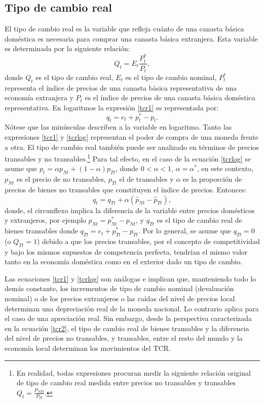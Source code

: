 \documentclass[12pt,letterpaper]{article}
\begin{document}
\subsection*{Tipo de cambio real}
El tipo de cambio real es la variable que refleja cuánto de una canasta básica doméstica es necesaria para comprar una canasta básica extranjera. Esta variable es determinada por la siguiente relación:
\begin{equation}\label{tcr1}
Q_t=E_t\frac{P_t^*}{P_t},
\end{equation}
donde $Q_t$ es el tipo de cambio real, $E_t$ es el tipo de cambio nominal, $P_t^*$ representa el índice de precios de una canasta básica representativa de una economía extranjera y $P_t$ es el índice de precios de una canasta básica doméstica representativa. En logaritmos la expresión \ref{tcr1} es representada por:
\begin{equation}\label{tcrlog}
q_t=e_t+p_t^*-p_t.
\end{equation}
Nótese que las minúsculas describen a la variable en logaritmo. Tanto las expresiones \ref{tcr1} y \ref{tcrlog} representan el poder de compra de una moneda frente a otra. El tipo de cambio real también puede ser analizado en términos de precios transables y no transables.\footnote{En realidad, todas expresiones procuran medir la siguiente relación original de tipo de cambio real medida entre precios no transables y transables $Q_t=\frac{P_{NTt}}{P_{Tt}}$.} Para tal efecto, en el caso de la ecuación \ref{tcrlog} se asume que $p_t=\alpha p_{Nt} + (1-\alpha)p_{Tt}$, donde $0<\alpha<1$, $\alpha=\alpha^*$, en este contexto, $p_{Nt}$ es el precio de no transables, $p_{Tt}$ el de transables y $\alpha$ es la proporción de precios de bienes no transables que constituyen el índice de precios. Entonces:
\begin{equation}\label{tcr2}
q_t=q_{Tt}+\alpha(\hat{p}_{Nt}-\hat{p}_{Tt}),
\end{equation}
donde, el circunflexo implica la diferencia de la variable entre precios domésticos y extranjeros, por ejemplo $\hat{p}_{Nt}=p_{Nt}^*-p_{Nt}$, y $q_{Tt}$ es el tipo de cambio real de bienes transables donde $q_{Tt}=e_t+p_{Tt}^*-p_{Tt}$. Por lo general, se asume que $q_{Tt}=0$ (o $Q_{Tt}=1$) debido a que los precios transables, por el concepto de competitividad y bajo los mismos supuestos de competencia perfecta, tendrían el mismo valor tanto en la economía doméstica como en el exterior dado un tipo de cambio. 

Las ecuaciones \ref{tcr1} y \ref{tcrlog} son análogas e implican que, manteniendo todo lo demás constante, los incrementos de tipo de cambio nominal (devaluación nominal) o de los precios extranjeros o las caídas del nivel de precios local determinan una depreciación real de la moneda nacional. Lo contrario aplica para el caso de una apreciación real. Sin embargo, desde la perspectiva caracterizada en la ecuación \ref{tcr2}, el tipo de cambio real de bienes transables y la diferencia del nivel de precios no transables, y transables, entre el resto del mundo y la economía local determinan los movimientos del TCR. 
\end{document}
